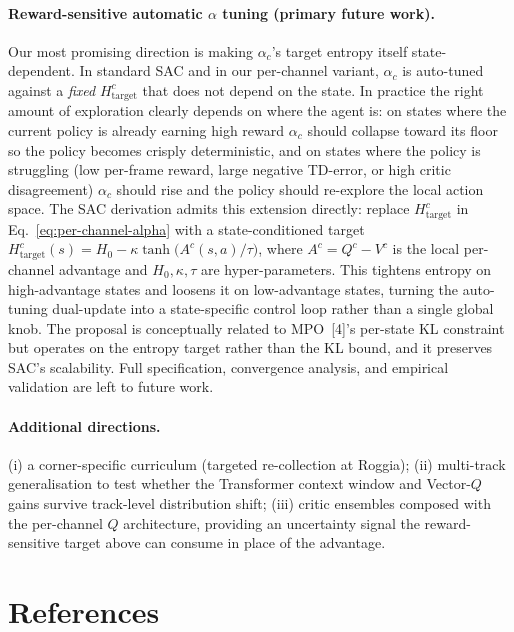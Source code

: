 \documentclass{article}
\begin{document}
\paragraph{Reward-sensitive automatic $\alpha$ tuning (primary future work).}
Our most promising direction is making $\alpha_c$'s target entropy
itself state-dependent. In standard SAC and in our per-channel
variant, $\alpha_c$ is auto-tuned against a \emph{fixed}
$H^c_\text{target}$ that does not depend on the state. In practice
the right amount of exploration clearly depends on where the agent
is: on states where the current policy is already earning high
reward $\alpha_c$ should collapse toward its floor so the policy
becomes crisply deterministic, and on states where the policy is
struggling (low per-frame reward, large negative TD-error, or high
critic disagreement) $\alpha_c$ should rise and the policy should
re-explore the local action space. The SAC derivation admits this
extension directly: replace $H^c_\text{target}$ in
Eq.~\eqref{eq:per-channel-alpha} with a state-conditioned target
$H^c_\text{target}(s) = H_0 - \kappa\tanh\bigl(A^c(s,a)/\tau\bigr)$,
where $A^c{=}Q^c - V^c$ is the local per-channel advantage and
$H_0, \kappa, \tau$ are hyper-parameters. This tightens entropy on
high-advantage states and loosens it on low-advantage states, turning
the auto-tuning dual-update into a state-specific control loop rather
than a single global knob. The proposal is conceptually related to
MPO~[4]'s per-state KL constraint but operates on the entropy target
rather than the KL bound, and it preserves SAC's scalability. Full
specification, convergence analysis, and empirical validation are
left to future work.

\paragraph{Additional directions.}
(i) a corner-specific curriculum (targeted re-collection at Roggia);
(ii) multi-track generalisation to test whether the Transformer
context window and Vector-$Q$ gains survive track-level distribution
shift;
(iii) critic ensembles composed with the per-channel $Q$ architecture,
providing an uncertainty signal the reward-sensitive target above
can consume in place of the advantage.

\section*{References}

\small
\end{document}
